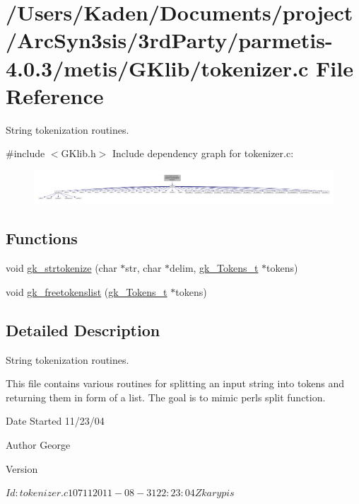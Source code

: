\hypertarget{a00161}{}\section{/\+Users/\+Kaden/\+Documents/project/\+Arc\+Syn3sis/3rd\+Party/parmetis-\/4.0.3/metis/\+G\+Klib/tokenizer.c File Reference}
\label{a00161}


String tokenization routines.  


{\ttfamily \#include $<$G\+Klib.\+h$>$}\newline
Include dependency graph for tokenizer.\+c\+:\nopagebreak
\begin{figure}[H]
\begin{center}
\leavevmode
\includegraphics[width=350pt]{a00162}
\end{center}
\end{figure}
\subsection*{Functions}
\begin{DoxyCompactItemize}
\item 
void \hyperlink{a00161_a551670b0d23e97d4655a827762c6bacd}{gk\+\_\+strtokenize} (char $\ast$str, char $\ast$delim, \hyperlink{a00654}{gk\+\_\+\+Tokens\+\_\+t} $\ast$tokens)
\item 
void \hyperlink{a00161_a721067a5b35f35422d141ad8652021ec}{gk\+\_\+freetokenslist} (\hyperlink{a00654}{gk\+\_\+\+Tokens\+\_\+t} $\ast$tokens)
\end{DoxyCompactItemize}


\subsection{Detailed Description}
String tokenization routines. 

This file contains various routines for splitting an input string into tokens and returning them in form of a list. The goal is to mimic perl\textquotesingle{}s split function.

\begin{DoxyDate}{Date}
Started 11/23/04 
\end{DoxyDate}
\begin{DoxyAuthor}{Author}
George 
\end{DoxyAuthor}
\begin{DoxyVersion}{Version}
\begin{DoxyVerb}$Id: tokenizer.c 10711 2011-08-31 22:23:04Z karypis $ \end{DoxyVerb}
 
\end{DoxyVersion}


